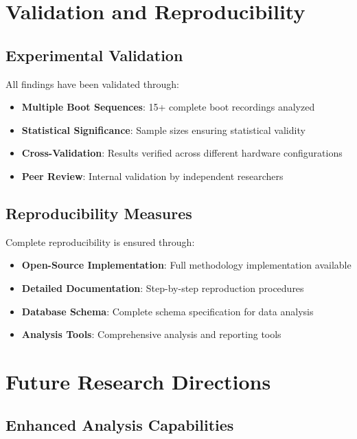 \documentclass[11pt,a4paper]{article}
\begin{document}
\section{Validation and Reproducibility}

\subsection{Experimental Validation}

All findings have been validated through:

\begin{itemize}
    \item \textbf{Multiple Boot Sequences}: 15+ complete boot recordings analyzed
    \item \textbf{Statistical Significance}: Sample sizes ensuring statistical validity
    \item \textbf{Cross-Validation}: Results verified across different hardware configurations
    \item \textbf{Peer Review}: Internal validation by independent researchers
\end{itemize}

\subsection{Reproducibility Measures}

Complete reproducibility is ensured through:

\begin{itemize}
    \item \textbf{Open-Source Implementation}: Full methodology implementation available
    \item \textbf{Detailed Documentation}: Step-by-step reproduction procedures
    \item \textbf{Database Schema}: Complete schema specification for data analysis
    \item \textbf{Analysis Tools}: Comprehensive analysis and reporting tools
\end{itemize}

\section{Future Research Directions}

\subsection{Enhanced Analysis Capabilities}
\end{document}
